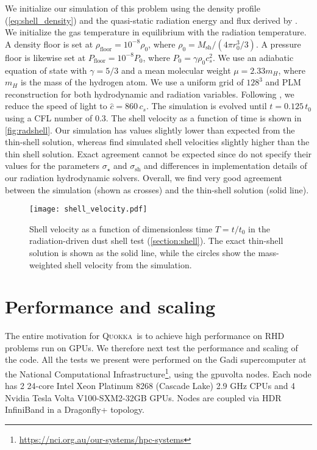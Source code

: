 \documentclass[fleqn,usenatbib]{mnras}
\newcommand{\quokka}{\textsc{Quokka}}
\begin{document}
We initialize our simulation of this problem using the density profile (\autoref{eq:shell_density}) and the quasi-static radiation energy and flux derived by . We initialize the gas temperature in equilibrium with the radiation temperature. A density floor is set at $\rho_{\text{floor}} = 10^{-8} \rho_0$, where $\rho_0 = M_{\text{sh}} / (4 \pi r_0^3 / 3)$. A pressure floor is likewise set at $P_{\text{floor}} = 10^{-8} P_0$, where $P_0 = \gamma \rho_0 c_s^2$. We use an adiabatic equation of state with $\gamma = 5/3$ and a mean molecular weight $\mu = 2.33 m_H$, where $m_H$ is the mass of the hydrogen atom. We use a uniform grid of $128^3$ and PLM reconstruction for both hydrodynamic and radiation variables. Following , we reduce the speed of light to $\hat c = 860 \, c_s$. The simulation is evolved until $t = 0.125 \, t_0$ using a CFL number of $0.3$. The shell velocity as a function of time is shown in \autoref{fig:radshell}. Our simulation has values slightly lower than expected from the thin-shell solution, whereas  find simulated shell velocities slightly higher than the thin shell solution. Exact agreement cannot be expected since  do not specify their values for the parameters $\sigma_{\star}$ and $\sigma_{\text{sh}}$ and differences in implementation details of our radiation hydrodynamic solvers. Overall, we find very good agreement between the simulation (shown as crosses) and the thin-shell solution (solid line). 

\begin{figure}
    \texttt{[image: shell\_velocity.pdf]}
    \caption{Shell velocity as a function of dimensionless time $T = t/t_0$ in the radiation-driven dust shell test (\autoref{section:shell}). The exact thin-shell solution is shown as the solid line, while the circles show the mass-weighted shell velocity from the simulation.}
    \label{fig:radshell}
\end{figure}

\section{Performance and scaling}
The entire motivation for \quokka~is to achieve high performance on RHD problems run on GPUs. We therefore next test the performance and scaling of the code. All the tests we present were performed on the Gadi supercomputer at the National Computational Infrastructure\footnote{\url{https://nci.org.au/our-systems/hpc-systems}}, using the gpuvolta nodes. Each node has 2 24-core Intel Xeon Platinum 8268 (Cascade Lake) 2.9 GHz CPUs and 4 Nvidia Tesla Volta V100-SXM2-32GB GPUs. Nodes are coupled via HDR InfiniBand in a Dragonfly+ topology.
\end{document}
